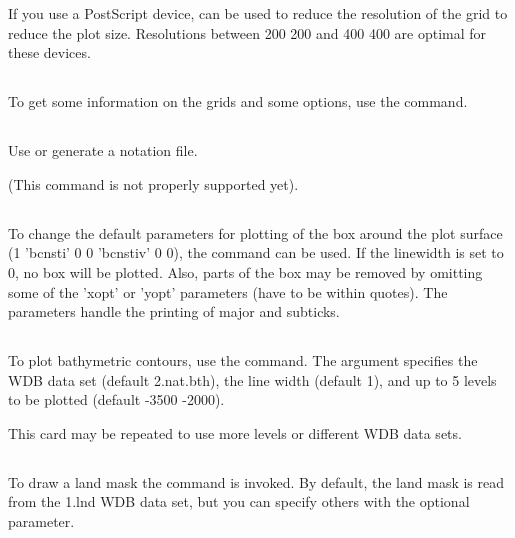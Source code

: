 If you use a PostScript device,  can be used to reduce
the resolution of the grid to reduce the plot size. Resolutions between
200 200 and 400 400 are optimal for these devices.

\subsection{}
To get some information on the grids and some options, use the
 command.

\subsection{}
Use or generate a notation file.

(This command is not properly supported yet).

\subsection{}
To change the default parameters for plotting of the box around the
plot surface (1 'bcnsti' 0 0 'bcnstiv' 0 0), the  command
can be used. If the linewidth is set to 0, no box will be plotted.
Also, parts of the box may be removed by omitting some of the
'xopt' or 'yopt' parameters (have to be within quotes). The
parameters  handle the printing of major
and subticks.

\subsection{}
To plot bathymetric contours, use the  command.
The argument  specifies the WDB data set
(default 2.nat.bth),  the line width (default 1),
and  up to 5 levels to be plotted (default -3500 -2000).

This card may be repeated to use more levels or different WDB data sets.

\subsection{}
To draw a land mask the  command is invoked. By default,
the land mask is read from the 1.lnd WDB data set, but you can
specify others with the optional  parameter.

